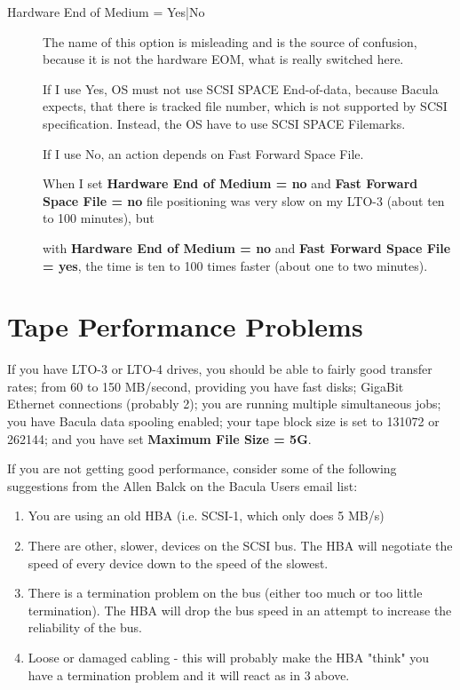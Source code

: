 \begin{description}
\item [Hardware End of Medium = Yes|No]
  The name of this option is misleading and is the source of confusion,
  because it is not the hardware EOM, what is really switched here.

  If I use Yes, OS must not use SCSI SPACE End-of-data, because Bacula
  expects, that there is tracked file number, which is not supported by
  SCSI specification.  Instead, the OS have to use SCSI SPACE Filemarks.

  If I use No, an action depends on Fast Forward Space File.

  When I set {\bf Hardware End of Medium = no}
  and {\bf Fast Forward Space File = no}
  file positioning was very slow
  on my LTO-3 (about ten to 100 minutes), but

  with {\bf Hardware End of Medium = no} and
{\bf Fast Forward Space File = yes}, the time is ten to
100 times faster (about one to two minutes).

\end{description}

\section{Tape Performance Problems}
If you have LTO-3 or LTO-4 drives, you should be able to
fairly good transfer rates; from 60 to 150 MB/second, providing
you have fast disks; GigaBit Ethernet connections (probably 2); you are 
running multiple simultaneous jobs; you have Bacula data spooling
enabled; your tape block size is set to 131072 or 262144; and
you have set {\bf Maximum File Size = 5G}.

If you are not getting good performance, consider some of the following
suggestions from the Allen Balck on the Bacula Users email list:

\begin{enumerate}
\item You are using an old HBA (i.e. SCSI-1, which only does 5 MB/s)

\item There are other, slower, devices on the SCSI bus. The HBA will
   negotiate the speed of every device down to the speed of the
   slowest.

\item There is a termination problem on the bus (either too much or
   too little termination). The HBA will drop the bus speed in an
   attempt to increase the reliability of the bus.

\item Loose or damaged cabling - this will probably make the HBA "think"
   you have a termination problem and it will react as in 3 above.
\end{enumerate}

